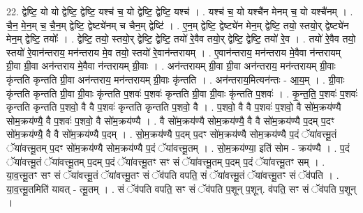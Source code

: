 \documentclass[17pt]{extarticle}
\begin{document}
22. द्वेष्टि॒ यो यो द्वेष्टि॒ द्वेष्टि॒ यश्च॑ च॒ यो द्वेष्टि॒ द्वेष्टि॒ यश्च॑ । . यश्च॑ च॒ यो यश्चै॑न मेनम् च॒ यो यश्चै॑नम् । . चै॒न॒ मे॒न॒म् च॒ चै॒न॒म् द्वेष्टि॒ द्वेष्ट्ये॑नम् च चैन॒म् द्वेष्टि॑ । . ए॒न॒म् द्वेष्टि॒ द्वेष्ट्ये॑न मेन॒म् द्वेष्टि॒ तयो॒ स्तयो॒र् द्वेष्ट्ये॑न मेन॒म् द्वेष्टि॒ तयोः᳚ । . द्वेष्टि॒ तयो॒ स्तयो॒र् द्वेष्टि॒ द्वेष्टि॒ तयो॑ रे॒वैव तयो॒र् द्वेष्टि॒ द्वेष्टि॒ तयो॑ रे॒व । . तयो॑ रे॒वैव तयो॒ स्तयो॑ रे॒वान॑न्तराय॒ मन॑न्तराय मे॒व तयो॒ स्तयो॑ रे॒वान॑न्तरायम् । . ए॒वान॑न्तराय॒ मन॑न्तराय मे॒वैवा न॑न्तरायम् ग्री॒वा ग्री॒वा अन॑न्तराय मे॒वैवा न॑न्तरायम् ग्री॒वाः । . अन॑न्तरायम् ग्री॒वा ग्री॒वा अन॑न्तराय॒ मन॑न्तरायम् ग्री॒वाः कृ॑न्तति कृन्तति ग्री॒वा अन॑न्तराय॒ मन॑न्तरायम् ग्री॒वाः कृ॑न्तति । . अन॑न्तराय॒मित्यन॑न्तः - आ॒य॒म् । . ग्री॒वाः कृ॑न्तति कृन्तति ग्री॒वा ग्री॒वाः कृ॑न्तति प॒शवः॑ प॒शवः॑ कृन्तति ग्री॒वा ग्री॒वाः कृ॑न्तति प॒शवः॑ । . कृ॒न्त॒ति॒ प॒शवः॑ प॒शवः॑ कृन्तति कृन्तति प॒शवो॒ वै वै प॒शवः॑ कृन्तति कृन्तति प॒शवो॒ वै । . प॒शवो॒ वै वै प॒शवः॑ प॒शवो॒ वै सो॑म॒क्रय॑ण्यै सोम॒क्रय॑ण्यै॒ वै प॒शवः॑ प॒शवो॒ वै सो॑म॒क्रय॑ण्यै । . वै सो॑म॒क्रय॑ण्यै सोम॒क्रय॑ण्यै॒ वै वै सो॑म॒क्रय॑ण्यै प॒दम् प॒दꣳ सो॑म॒क्रय॑ण्यै॒ वै वै सो॑म॒क्रय॑ण्यै प॒दम् । . सो॒म॒क्रय॑ण्यै प॒दम् प॒दꣳ सो॑म॒क्रय॑ण्यै सोम॒क्रय॑ण्यै प॒दं ॅया॑वत्त्मू॒तं ॅया॑वत्त्मू॒तम् प॒दꣳ सो॑म॒क्रय॑ण्यै सोम॒क्रय॑ण्यै प॒दं ॅया॑वत्त्मू॒तम् । . सो॒म॒क्रय॑ण्या॒ इति॑ सोम - क्रय॑ण्यै । . प॒दं ॅया॑वत्त्मू॒तं ॅया॑वत्त्मू॒तम् प॒दम् प॒दं ॅया॑वत्त्मू॒तꣳ सꣳ सं ॅया॑वत्त्मू॒तम् प॒दम् प॒दं ॅया॑वत्त्मू॒तꣳ सम् । . या॒व॒त्त्मू॒तꣳ सꣳ सं ॅया॑वत्त्मू॒तं ॅया॑वत्त्मू॒तꣳ सं ॅव॑पति वपति॒ सं ॅया॑वत्त्मू॒तं ॅया॑वत्त्मू॒तꣳ सं ॅव॑पति । . या॒व॒त्त्मू॒तमिति॑ यावत् - त्मू॒तम् । . सं ॅव॑पति वपति॒ सꣳ सं ॅव॑पति प॒शून् प॒शून्. व॑पति॒ सꣳ सं ॅव॑पति प॒शून् । \newline
\end{document}
